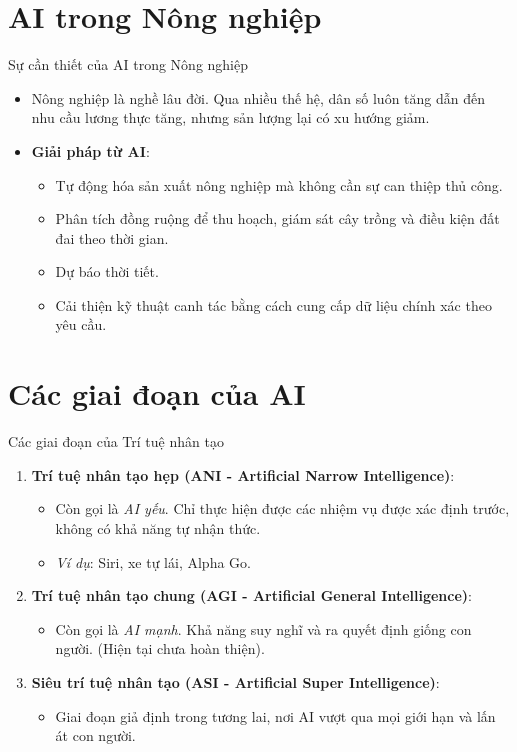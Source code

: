 \documentclass[aspectratio=169]{beamer}
\begin{document}
\section{AI trong Nông nghiệp}
\begin{frame}{Sự cần thiết của AI trong Nông nghiệp}
    \begin{itemize}
        \item Nông nghiệp là nghề lâu đời. Qua nhiều thế hệ, dân số luôn tăng dẫn đến nhu cầu lương thực tăng, nhưng sản lượng lại có xu hướng giảm.
        \item \textbf{Giải pháp từ AI}:
        \begin{itemize}
            \item Tự động hóa sản xuất nông nghiệp mà không cần sự can thiệp thủ công.
            \item Phân tích đồng ruộng để thu hoạch, giám sát cây trồng và điều kiện đất đai theo thời gian.
            \item Dự báo thời tiết.
            \item Cải thiện kỹ thuật canh tác bằng cách cung cấp dữ liệu chính xác theo yêu cầu.
        \end{itemize}
    \end{itemize}
\end{frame}

\section{Các giai đoạn của AI}
\begin{frame}{Các giai đoạn của Trí tuệ nhân tạo}
    \begin{enumerate}
        \item \textbf{Trí tuệ nhân tạo hẹp (ANI - Artificial Narrow Intelligence)}:
        \begin{itemize}
            \item Còn gọi là \textit{AI yếu}. Chỉ thực hiện được các nhiệm vụ được xác định trước, không có khả năng tự nhận thức.
            \item \textit{Ví dụ}: Siri, xe tự lái, Alpha Go.
        \end{itemize}
        \item \textbf{Trí tuệ nhân tạo chung (AGI - Artificial General Intelligence)}:
        \begin{itemize}
            \item Còn gọi là \textit{AI mạnh}. Khả năng suy nghĩ và ra quyết định giống con người. (Hiện tại chưa hoàn thiện).
        \end{itemize}
        \item \textbf{Siêu trí tuệ nhân tạo (ASI - Artificial Super Intelligence)}:
        \begin{itemize}
            \item Giai đoạn giả định trong tương lai, nơi AI vượt qua mọi giới hạn và lấn át con người.
        \end{itemize}
    \end{enumerate}
\end{frame}
\end{document}
